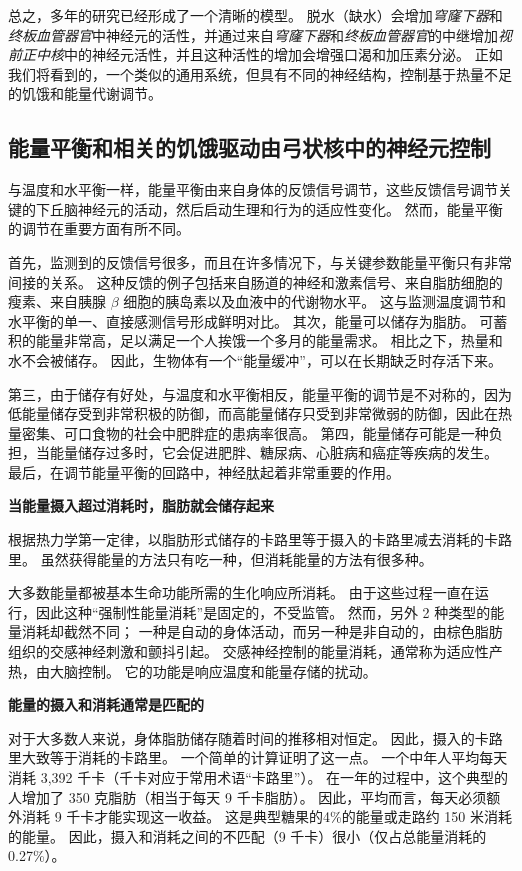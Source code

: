 总之，多年的研究已经形成了一个清晰的模型。
脱水（缺水）会增加\textit{穹窿下器}和\textit{终板血管器官}中神经元的活性，并通过来自\textit{穹窿下器}和\textit{终板血管器官}的中继增加\textit{视前正中核}中的神经元活性，并且这种活性的增加会增强口渴和加压素分泌。
正如我们将看到的，一个类似的通用系统，但具有不同的神经结构，控制基于热量不足的饥饿和能量代谢调节。



\subsection{能量平衡和相关的饥饿驱动由弓状核中的神经元控制}

与温度和水平衡一样，能量平衡由来自身体的反馈信号调节，这些反馈信号调节关键的下丘脑神经元的活动，然后启动生理和行为的适应性变化。
然而，能量平衡的调节在重要方面有所不同。


首先，监测到的反馈信号很多，而且在许多情况下，与关键参数能量平衡只有非常间接的关系。
这种反馈的例子包括来自肠道的神经和激素信号、来自脂肪细胞的瘦素、来自胰腺 $ \beta $ 细胞的胰岛素以及血液中的代谢物水平。
这与监测温度调节和水平衡的单一、直接感测信号形成鲜明对比。
其次，能量可以储存为脂肪。
可蓄积的能量非常高，足以满足一个人挨饿一个多月的能量需求。
相比之下，热量和水不会被储存。
因此，生物体有一个“能量缓冲”，可以在长期缺乏时存活下来。


第三，由于储存有好处，与温度和水平衡相反，能量平衡的调节是不对称的，因为低能量储存受到非常积极的防御，而高能量储存只受到非常微弱的防御，因此在热量密集、可口食物的社会中肥胖症的患病率很高。
第四，能量储存可能是一种负担，当能量储存过多时，它会促进肥胖、糖尿病、心脏病和癌症等疾病的发生。
最后，在调节能量平衡的回路中，神经肽起着非常重要的作用。


\textbf{当能量摄入超过消耗时，脂肪就会储存起来}

根据热力学第一定律，以脂肪形式储存的卡路里等于摄入的卡路里减去消耗的卡路里。
虽然获得能量的方法只有吃一种，但消耗能量的方法有很多种。


大多数能量都被基本生命功能所需的生化响应所消耗。
由于这些过程一直在运行，因此这种“强制性能量消耗”是固定的，不受监管。
然而，另外 2 种类型的能量消耗却截然不同；
一种是自动的身体活动，而另一种是非自动的，由棕色脂肪组织的交感神经刺激和颤抖引起。
交感神经控制的能量消耗，通常称为适应性产热，由大脑控制。
它的功能是响应温度和能量存储的扰动。


\textbf{能量的摄入和消耗通常是匹配的}

对于大多数人来说，身体脂肪储存随着时间的推移相对恒定。
因此，摄入的卡路里大致等于消耗的卡路里。
一个简单的计算证明了这一点。
一个中年人平均每天消耗 3,392 千卡（千卡对应于常用术语“卡路里”）。
在一年的过程中，这个典型的人增加了 350 克脂肪（相当于每天 9 千卡脂肪）。
因此，平均而言，每天必须额外消耗 9 千卡才能实现这一收益。
这是典型糖果的4\%的能量或走路约 150 米消耗的能量。
因此，摄入和消耗之间的不匹配（9 千卡）很小（仅占总能量消耗的 0.27\%）。


